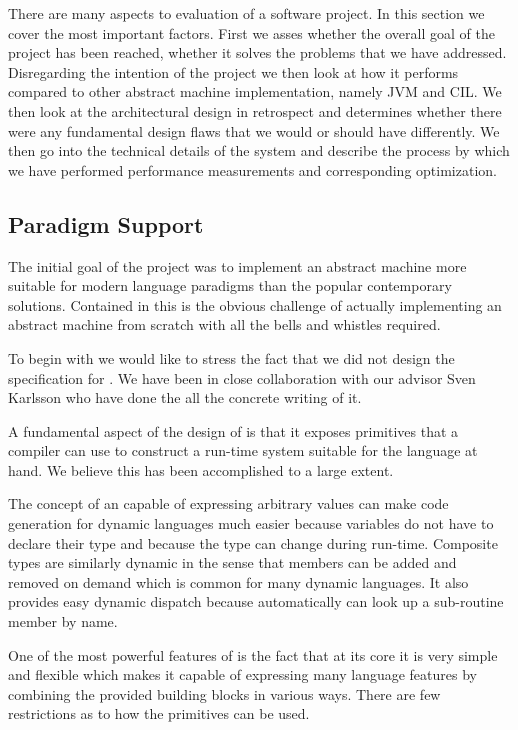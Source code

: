 There are many aspects to evaluation of a software project. In this section we
cover the most important factors. First we asses whether the overall goal of the
project has been reached, whether it solves the problems that we have
addressed. Disregarding the intention of the project we then look at how it
performs compared to other abstract machine implementation, namely JVM and
CIL. We then look at the architectural design in retrospect and determines
whether there were any fundamental design flaws that we would or should have
differently. We then go into the technical details of the system and describe
the process by which we have performed performance measurements and
corresponding optimization.

\subsection{Paradigm Support}

The initial goal of the project was to implement an abstract machine more
suitable for modern language paradigms than the popular contemporary
solutions. Contained in this is the obvious challenge of actually implementing
an abstract machine from scratch with all the bells and whistles required.

To begin with we would like to stress the fact that we did not design the
specification for \thename{}. We have been in close collaboration with our
advisor Sven Karlsson who have done the all the concrete writing of it.

A fundamental aspect of the design of \thename{} is that it exposes primitives
that a compiler can use to construct a run-time system suitable for the language
at hand. We believe this has been accomplished to a large extent.

The concept of an  capable of expressing arbitrary values can make
code generation for dynamic languages much easier because variables do not have
to declare their type and because the type can change during run-time. Composite
types are similarly dynamic in the sense that members can be added and removed
on demand which is common for many dynamic languages. It also provides easy
dynamic dispatch because \thename{} automatically can look up a sub-routine
member by name.

One of the most powerful features of \thename{} is the fact that at its core it
is very simple and flexible which makes it capable of expressing many language
features by combining the provided building blocks in various ways. There are
few restrictions as to how the primitives can be used.

